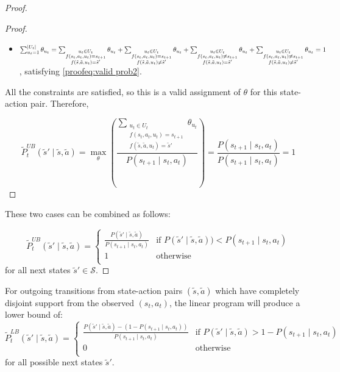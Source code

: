 \begin{proof}
\begin{proof}
\begin{itemize}
        \item $\sum_{u_t = 1}^{|U_t|} \theta_{u_t} = \sum_{\substack{u_t \in U_t \\f(s_t, a_t, u_t) = s_{t+1} \\ f(\tilde{s}, \tilde{a}, u_t) = \tilde{s}'}} \theta_{u_t} + \sum_{\substack{u_t \in U_t \\f(s_t, a_t, u_t) = s_{t+1} \\ f(\tilde{s}, \tilde{a}, u_t) \neq \tilde{s}'}} \theta_{u_t} + \sum_{\substack{u_t \in U_t \\f(s_t, a_t, u_t) \neq s_{t+1} \\ f(\tilde{s}, \tilde{a}, u_t) = \tilde{s}'}} \theta_{u_t} \\ + \sum_{\substack{u_t \in U_t \\f(s_t, a_t, u_t) \neq s_{t+1} \\ f(\tilde{s}, \tilde{a}, u_t) \neq \tilde{s}'}} \theta_{u_t} = 1$, satisfying \eqref{proofeq:valid prob2}.
    \end{itemize}

     All the constraints are satisfied, so this is a valid assignment of $\theta$ for this state-action pair. Therefore,

        \[\tilde{P}_{t}^{UB}(\tilde{s}' \mid \tilde{s}, \tilde{a}) = \max_\theta \left(\frac{\sum_{\substack{u_t \in U_t \\f(s_t, a_t, u_t) = s_{t+1} \\ f(\tilde{s}, \tilde{a}, u_t) = \tilde{s}'}} \theta_{u_t}}{P(s_{t+1} \mid s_t, a_t)}\right) = \frac{P(s_{t+1} \mid s_t, a_t)}{P(s_{t+1} \mid s_t, a_t)} = 1\]
    
\end{proof}

These two cases can be combined as follows:

\[\tilde{P}_{t}^{UB}(\tilde{s}' \mid \tilde{s}, \tilde{a}) = 
\begin{cases}
\frac{P(\tilde{s}' \mid \tilde{s}, \tilde{a})}{P(s_{t+1} \mid s_t, a_t)} & \text{if $P(\tilde{s}' \mid \tilde{s}, \tilde{a})) < P(s_{t+1} \mid s_t, a_t)$} \\
1 & \text{otherwise} \\
\end{cases}
\]
for all next states $\tilde{s}' \in \mathcal{S}$.
\end{proof}

\pagebreak
\begin{theorem}
\label{proof theorem: lb disjoint}
For outgoing transitions from state-action pairs $(\tilde{s}, \tilde{a})$ which have completely disjoint support from the observed $(s_t, a_t)$, the linear program will produce a lower bound of:
\[\tilde{P}_{t}^{LB}(\tilde{s}' \mid \tilde{s}, \tilde{a}) = 
\begin{cases}
\frac{P(\tilde{s}' \mid \tilde{s}, \tilde{a}) - (1 - P(s_{t+1} \mid s_t, a_t))}{P(s_{t+1} \mid s_t, a_t)} & \text{if $P(\tilde{s}' \mid \tilde{s}, \tilde{a}) > 1 - P(s_{t+1} \mid s_t, a_t)$}\\
0 & \text{otherwise}\\
\end{cases}
\]
for all possible next states $\tilde{s}'$.
\end{theorem}

